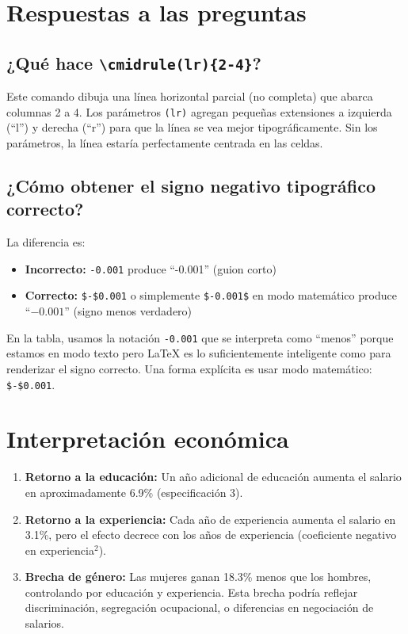 \documentclass[12pt, a4paper]{article}
\begin{document}
\section{Respuestas a las preguntas}

\subsection*{¿Qué hace \texttt{\textbackslash cmidrule(lr)\{2-4\}}?}

Este comando dibuja una línea horizontal parcial (no completa) que abarca 
columnas 2 a 4. Los parámetros \texttt{(lr)} agregan pequeñas extensiones 
a izquierda (``l'') y derecha (``r'') para que la línea se vea mejor 
tipográficamente. Sin los parámetros, la línea estaría perfectamente centrada 
en las celdas.

\subsection*{¿Cómo obtener el signo negativo tipográfico correcto?}

La diferencia es:
\begin{itemize}
  \item \textbf{Incorrecto:} \texttt{-0.001} produce ``-0.001'' (guion corto)
  \item \textbf{Correcto:} \texttt{\$-\$0.001} o simplemente \texttt{\$-0.001\$} 
        en modo matemático produce ``$-0.001$'' (signo menos verdadero)
\end{itemize}

En la tabla, usamos la notación \verb|-0.001| que se interpreta como 
``menos'' porque estamos en modo texto pero \LaTeX{} es lo suficientemente 
inteligente como para renderizar el signo correcto. Una forma explícita es 
usar modo matemático: \verb|$-$0.001|.

\section*{Interpretación económica}

\begin{enumerate}
  \item \textbf{Retorno a la educación:} Un año adicional de educación aumenta 
        el salario en aproximadamente 6.9\% (especificación 3).
  \item \textbf{Retorno a la experiencia:} Cada año de experiencia aumenta el 
        salario en 3.1\%, pero el efecto decrece con los años de experiencia 
        (coeficiente negativo en experiencia$^2$).
  \item \textbf{Brecha de género:} Las mujeres ganan 18.3\% menos que los hombres, 
        controlando por educación y experiencia. Esta brecha podría reflejar 
        discriminación, segregación ocupacional, o diferencias en negociación de salarios.
\end{enumerate}
\end{document}
